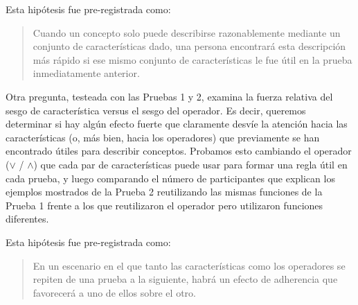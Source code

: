 \begin{hyp}
Esta hipótesis fue pre-registrada como:
\begin{quote}
Cuando un concepto solo puede describirse razonablemente mediante un conjunto de características dado, una persona encontrará esta descripción más rápido si ese mismo conjunto de características le fue útil en la prueba inmediatamente anterior.
\end{quote}
\end{hyp}

\begin{hyp} \label{Hip:StickinessFeatureOperator}
Otra pregunta, testeada con las Pruebas 1 y 2, examina la fuerza relativa del sesgo de característica versus el sesgo del operador. Es decir, queremos determinar si hay algún efecto fuerte que claramente desvíe la atención hacia las características (o, más bien, hacia los operadores) que previamente se han encontrado útiles para describir conceptos. Probamos esto cambiando el operador ($ \lor $ / $ \land $) que cada par de características puede usar para formar una regla útil en cada prueba, y luego comparando el número de participantes que explican los ejemplos mostrados de la Prueba 2 reutilizando las mismas funciones de la Prueba 1 frente a los que reutilizaron el operador pero utilizaron funciones diferentes.

Esta hipótesis fue pre-registrada como:
\begin{quote}
En un escenario en el que tanto las características como los operadores se repiten de una prueba a la siguiente, habrá un efecto de adherencia que favorecerá a uno de ellos sobre el otro.
\end{quote}
\end{hyp}


